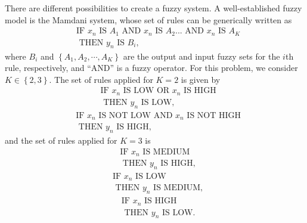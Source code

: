 \documentclass[english]{sobraep}
\begin{document}
There are different possibilities to create a fuzzy system. A well-established fuzzy model is the Mamdani system, whose set of rules can be generically written as
\begin{align}
    &\text{IF } x_n \text{ IS } A_1 \text{ AND } x_n \text{ IS } A_2 ... \text{ AND } x_n \text{ IS } A_K \nonumber \\
    &\text{ THEN } y_n \text{ IS } B_i, \nonumber
\end{align}
where \(B_i\) and \(\left\{ A_1, A_2, \cdots, A_K \right\}\) are the output and input fuzzy sets for the \(i\)th rule, respectively, and ``AND'' is a fuzzy operator. For this problem, we consider \(K \in \left\{ 2,3 \right\}\). The set of rules applied for \(K=2\) is given by
\begin{align}
    &\text{IF } x_n \text{ IS LOW OR } x_n \text{ IS HIGH} \nonumber \\
    &\text{ THEN } y_n \text{ IS LOW}, \nonumber
\end{align}
\begin{align}
    &\text{IF } x_n \text{ IS NOT LOW AND } x_n \text{ IS NOT HIGH} \nonumber \\
    &\text{ THEN } y_n \text{ IS HIGH}, \nonumber
\end{align}
and the set of rules applied for \(K=3\) is
\begin{align}
    &\text{IF } x_n \text{ IS MEDIUM} \nonumber \\
    &\text{ THEN } y_n \text{ IS HIGH}, \nonumber
\end{align}
\begin{align}
    &\text{IF } x_n \text{ IS LOW} \nonumber \\
    &\text{ THEN } y_n \text{ IS MEDIUM}, \nonumber
\end{align}
\begin{align}
    &\text{IF } x_n \text{ IS HIGH} \nonumber \\
    &\text{ THEN } y_n \text{ IS LOW}. \nonumber
\end{align}
\end{document}
